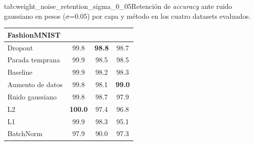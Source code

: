 \begin{table}{tab:weight_noise_retention_sigma_0_05}{Retención de \textit{accuracy} ante ruido gaussiano en pesos ($\sigma$=0.05) por capa y método en los cuatro datasets evaluados.}
\begin{tabular}{lccc}
\multicolumn{4}{l}{\textbf{FashionMNIST}}\\
\midrule
Dropout & 99.8 & \textbf{98.8} & 98.7 \\
Parada temprana & 99.9 & 98.5 & 98.5 \\
Baseline & 99.9 & 98.2 & 98.3 \\
Aumento de datos & 99.8 & 98.1 & \textbf{99.0} \\
Ruido gaussiano & 99.8 & 98.7 & 97.9 \\
L2 & \textbf{100.0} & 97.4 & 96.8 \\
L1 & 99.9 & 98.3 & 95.1 \\
BatchNorm & 97.9 & 90.0 & 97.3 \\
\bottomrule
\end{tabular}
\end{table}